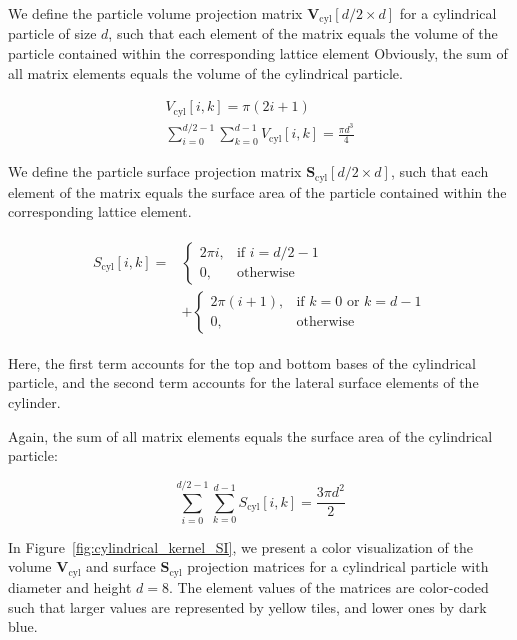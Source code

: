 \documentclass[10pt, a4paper]{article}
\begin{document}
\begin{multicols}{2}
We define the particle volume projection matrix $\mathbf{V}_{\textrm{cyl}}[d/2 \times d]$ for a cylindrical particle of size $d$, such that each element of the matrix equals the volume of the particle contained within the corresponding lattice element
Obviously, the sum of all matrix elements equals the volume of the cylindrical particle.

\begin{eqnarray}
    V_{\textrm{cyl}}[i, k] = \pi(2i + 1) \\
    \sum_{i=0}^{d/2 - 1} \sum_{k=0}^{d - 1} V_{\textrm{cyl}}[i, k] = \frac{\pi d^3}{4}
\end{eqnarray}

We define the particle surface projection matrix $\mathbf{S}_{\textrm{cyl}}[d/2 \times d]$, such that each element of the matrix equals the surface area of the particle contained within the corresponding lattice element.


\begin{align}
    \begin{split}
        S_{\textrm{cyl}}[i, k] = 
        &\begin{cases}
            2 \pi i,   & \text{if } i = d/2 - 1 \\
            0,         & \text{otherwise}
        \end{cases}
        \\
        &+
        \begin{cases}
            2 \pi (i + 1), & \text{if } k = 0 \text{ or } k = d - 1 \\
            0,             & \text{otherwise}
        \end{cases}
    \end{split}
\end{align}

Here, the first term accounts for the top and bottom bases of the cylindrical particle, and the second term accounts for the lateral surface elements of the cylinder.

Again, the sum of all matrix elements equals the surface area of the cylindrical particle:

\begin{equation}
    \sum_{i=0}^{d/2 - 1} \sum_{k=0}^{d - 1} S_{\textrm{cyl}}[i, k] = \frac{3 \pi d^2}{2}
\end{equation}

In Figure~\ref{fig:cylindrical_kernel_SI}, we present a color visualization of the volume $\mathbf{V}_{\textrm{cyl}}$ and surface $\mathbf{S}_{\textrm{cyl}}$ projection matrices for a cylindrical particle with diameter and height $d = 8$.
The element values of the matrices are color-coded such that larger values are represented by yellow tiles, and lower ones by dark blue.


\end{multicols}
\end{document}
